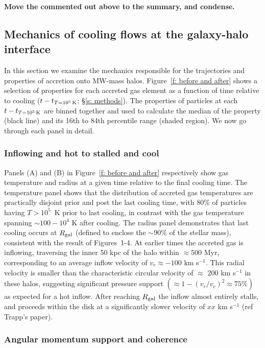 \documentclass[fleqn,usenatbib]{mnras}
\newcommand{\tcon}{t_{T=10^5\,{\rm K}}}
\begin{document}
\textbf{Move the commented out above to the summary, and condense.}

\subsection{Mechanics of cooling flows at the galaxy-halo interface}
\label{s: mechanics}

In this section we examine the mechanics responsible for the trajectories and properties of accretion onto MW-mass halos.
Figure~\ref{f: before and after} shows a selection of properties for each accreted gas element as a function of time relative to cooling  ($t - \tcon$; \S\ref{s: methods}).
The properties of particles at each $t - \tcon$ are binned together and used to calculate the median of the property (black line) and its 16th to 84th percentile range (shaded region).
We now go through each panel in detail.

\subsubsection{Inflowing and hot to stalled and cool}
\label{s: mechanics -- temp and radius}
Panels (A) and (B) in Figure~\ref{f: before and after} respectively show gas temperature and radius at a given time relative to the final cooling time.
The temperature panel shows that the distribution of accreted gas temperatures are practically disjoint prior and post the last cooling time, with $80\%$ of particles having $T > 10^5$~K prior to last cooling, in contrast with the gas temperature spanning $\sim100- 10^4$ K after cooling. 
The radius panel demonstrates that last cooling occurs at $R_{\rm gal}$ (defined to enclose the $\sim90\%$ of the stellar mass), consistent with the result of  Figures~1-4.
At earlier times the accreted gas is inflowing, traversing the inner 50 kpc of the halo within $\approx500$ Myr, corresponding to an average inflow velocity of $v_r\approx-100$ km s$^{-1}$.
This radial velocity is smaller than the characteristic circular velocity of $\approx$ 200 km s$^{-1}$ in these halos, suggesting significant pressure support $(\approx1-(v_r/v_c)^2\approx75\%)$ as expected for a hot inflow.
After reaching $R_{\rm gal}$ the inflow almost entirely stalls, and proceeds within the disk at a significantly slower velocity of $xx$ km s$^{-1}$ (ref Trapp's paper). 

\subsubsection{Angular momentum support and coherence}
\label{s: mechanics -- angular momentum}
\end{document}
